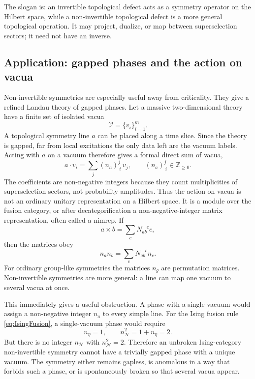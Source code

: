 \documentclass[11pt]{article}
\newcommand{\Z}{\mathbb{Z}}
\newcommand{\cN}{\mathcal{N}}
\begin{document}
The slogan is: an invertible topological defect acts as a symmetry operator on the Hilbert space, while a non-invertible topological defect is a more general topological operation.  It may project, dualize, or map between superselection sectors; it need not have an inverse.

\subsection{Application: gapped phases and the action on vacua}

Non-invertible symmetries are especially useful away from criticality.  They give a refined Landau theory of gapped phases.  Let a massive two-dimensional theory have a finite set of isolated vacua
\begin{equation}
  \mathcal V=\{v_i\}_{i=1}^m .
\end{equation}
A topological symmetry line $a$ can be placed along a time slice.  Since the theory is gapped, far from local excitations the only data left are the vacuum labels.  Acting with $a$ on a vacuum therefore gives a formal direct sum of vacua,
\begin{equation}
  a\cdot v_i=\sum_j (n_a)^j_{\ i}\,v_j,
  \qquad
  (n_a)^j_{\ i}\in\Z_{\ge 0} .
  \label{eq:nimrepaction}
\end{equation}
The coefficients are non-negative integers because they count multiplicities of superselection sectors, not probability amplitudes.  Thus the action on vacua is not an ordinary unitary representation on a Hilbert space.  It is a module over the fusion category, or after decategorification a non-negative-integer matrix representation, often called a nimrep.  If
\begin{equation}
  a\times b=\sum_c N_{ab}^{\phantom{ab}c}c,
\end{equation}
then the matrices obey
\begin{equation}
  n_a n_b=\sum_c N_{ab}^{\phantom{ab}c} n_c .
  \label{eq:nimreprelation}
\end{equation}
For ordinary group-like symmetries the matrices $n_g$ are permutation matrices.  Non-invertible symmetries are more general: a line can map one vacuum to several vacua at once.

This immediately gives a useful obstruction.  A phase with a single vacuum would assign a non-negative integer $n_a$ to every simple line.  For the Ising fusion rule \eqref{eq:IsingFusion}, a single-vacuum phase would require
\begin{equation}
  n_\eta=1,
  \qquad
  n_\cN^2=1+n_\eta=2 .
\end{equation}
But there is no integer $n_\cN$ with $n_\cN^2=2$.  Therefore an unbroken Ising-category non-invertible symmetry cannot have a trivially gapped phase with a unique vacuum.  The symmetry either remains gapless, is anomalous in a way that forbids such a phase, or is spontaneously broken so that several vacua appear.
\end{document}
